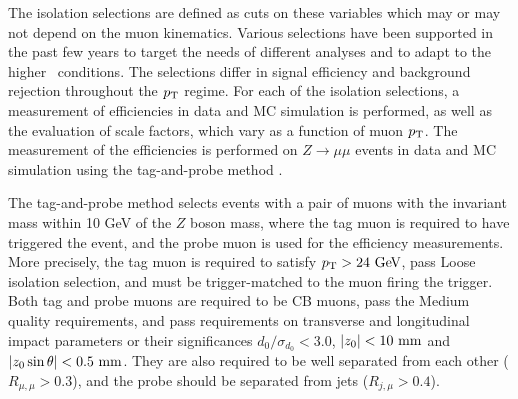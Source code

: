 The isolation selections are defined as cuts on these variables which
may or may not depend on the muon kinematics. Various
selections have been supported in the past few years to target the needs
of different analyses and to adapt to the higher \pileup~conditions. The 
selections differ in signal efficiency and background rejection
throughout the $p_{\text{T}}$ regime. For each of the isolation selections, a
measurement of efficiencies in data and MC simulation is performed, as
well as the evaluation of scale factors, which vary as a function
of muon $p_{\text{T}}$. The measurement of the efficiencies is performed on
$Z\rightarrow\mu\mu$ events in data and MC simulation using the
tag-and-probe method \cite{Aad:2016jkr}.

The tag-and-probe method selects events with a pair of muons with the invariant mass
within 10 GeV of the $Z$ boson mass, where the tag muon is required to
have triggered the event, and the probe muon is used for the efficiency
measurements. More precisely, the tag muon is required to satisfy
$p_{\text{T}} > 24~\text{Ge\kern -0.1em V}$, pass Loose isolation selection, and must be trigger-matched
to the muon firing the trigger. Both tag and probe muons are
required to be CB muons, pass the Medium quality requirements,
and pass requirements on transverse and longitudinal impact parameters
or their significances $d_0/\sigma_{d_0} < 3.0$, $|z_0| < 10~\text{mm}$ and
$|z_0 \sin{\theta}| < 0.5~\text{mm}$. They are also required to be well
separated from each other ($R_{\mu,\mu} > 0.3$), and the probe should
be separated from jets ($R_{j,\mu} > 0.4$).

